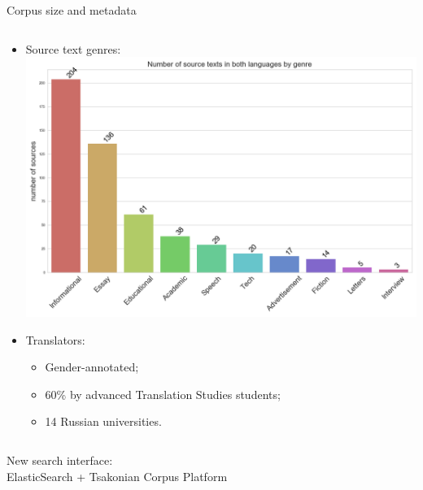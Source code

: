 \documentclass{beamer}
\begin{document}
\begin{frame}[fragile]
\begin{columns}[T]
\begin{column}{.55\textwidth}
\begin{block}{Corpus size and metadata}
\begin{columns}
	\begin{column}{.5\linewidth}
		\begin{itemize}
			\item Source text genres:
			\includegraphics[width=\linewidth,keepaspectratio]{images/genres-desc_hls_oct2018.png}
			\item Translators:
			\begin{itemize}
				\item Gender-annotated;
				\item 60\% by advanced Translation Studies students;
				\item 14 Russian universities.
			\end{itemize}
		\end{itemize}
	\end{column}
		
\end{columns}
\end{block}

\begin{block}{New search interface: \\ElasticSearch + Tsakonian Corpus Platform}


\end{block}
\end{column}
\end{columns}
\end{frame}
\end{document}
